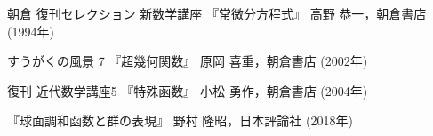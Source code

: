 \documentclass[a4paper,draft]{ltjsbook}
\begin{document}
\begin{thebibliography}{9}
     朝倉 復刊セレクション 新数学講座 『常微分方程式』 高野 恭一，朝倉書店 (1994年)

     すうがくの風景 7 『超幾何関数』 原岡 喜重，朝倉書店 (2002年)

     復刊 近代数学講座5 『特殊函数』 小松 勇作，朝倉書店 (2004年)


     『球面調和函数と群の表現』 野村 隆昭，日本評論社 (2018年)




\end{thebibliography}
\end{document}
